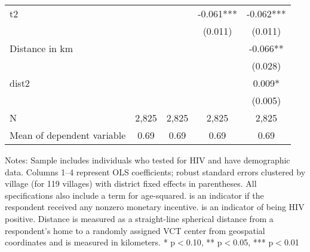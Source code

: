 \begin{table}[htbp]
\begin{center}
\begin{threeparttable}
\begin{tabular}{l*{4}{c}}
t2                  &               &               &      -0.061***&      -0.062***\\
                    &               &               &     (0.011)   &     (0.011)   \\
Distance in km      &               &               &               &      -0.066** \\
                    &               &               &               &     (0.028)   \\
dist2               &               &               &               &       0.009*  \\
                    &               &               &               &     (0.005)   \\
\midrule
N                   &       2,825   &       2,825   &       2,825   &       2,825   \\
Mean of dependent variable&        0.69   &        0.69   &        0.69   &        0.69   \\
\bottomrule
\end{tabular}
\begin{tablenotes}
\tiny
\item * Notes: Sample includes individuals who tested for HIV and have demographic data. Columns 1–4 represent OLS coefficients; robust standard errors clustered by village (for 119 villages) with district fixed effects in parentheses. All specifications also include a term for age-squared.  is an indicator if the respondent received any nonzero monetary incentive.  is an indicator of being HIV positive. Distance is measured as a straight-line spherical distance from a respondent's home to a randomly assigned VCT center from geospatial coordinates and is measured in kilometers.  * p$<$0.10, ** p$<$0.05, *** p$<$0.01
\end{tablenotes}
\end{threeparttable}
\end{center}
\end{table}
